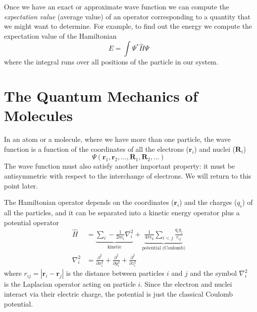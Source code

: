 \documentclass[../Main/chem371-notes.tex]{subfiles}
\begin{document}
Once we have an exact or approximate wave function we can compute the \emph{expectation value} (average value) of an operator corresponding to a quantity that we might want to determine.
For example, to find out the energy we compute the expectation value of the Hamiltonian
\begin{equation}
E = \int \Psi^* \hat{H} \Psi
\end{equation}
where the integral runs over all positions of the particle in our system.

\section{The Quantum Mechanics of Molecules}

In an atom or a molecule, where we have more than one particle, the wave function is a function of the coordinates of all the electrons ($\mathbf{r}_i$) and nuclei ($\mathbf{R}_i$)
\begin{equation}
\Psi(\mathbf{r}_1, \mathbf{r}_2, \ldots, \mathbf{R}_1,  \mathbf{R}_2,\ldots)
\end{equation}
The wave function must also satisfy another important property: it must be antisymmetric with respect to the interchange of electrons. We will return to this point later.

The Hamiltonian operator depends on the coordinates ($\mathbf{r}_i$) and the charges ($q_i$) of all the particles, and it can be separated into a kinetic energy operator plus a potential operator
\begin{align}
\hat{H} & =
\underbrace{
\sum_i -\frac{1}{2 m_i} \nabla^2_i
}_{\text{kinetic}}
+
\underbrace{
\frac{1}{4\pi \epsilon_0} \sum_{i < j} \frac{q_i q_j}{r_{ij}}
}_{\text{potential (Coulomb)}}  
\\
\nabla^2_i & = \frac{\partial^2}{\partial x_i^2} +  \frac{\partial^2}{\partial y_i^2} +  \frac{\partial^2}{\partial z_i^2}
\end{align}
where $r_{ij} = |\mathbf{r}_i - \mathbf{r}_j|$ is the distance between particles $i$ and $j$ and the symbol $\nabla^2_i$ is the Laplacian operator acting on particle $i$.
Since the electron and nuclei interact via their electric charge, the potential is just the classical Coulomb potential.
\end{document}
